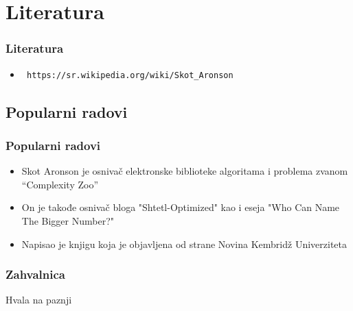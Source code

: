\documentclass{beamer}
\begin{document}
\section{Literatura}
\begin{frame}[fragile]\frametitle{Literatura}
	\begin{itemize}
	\item \begin{verbatim} https://sr.wikipedia.org/wiki/Skot_Aronson \end{verbatim}
	\end{itemize}
\end{frame}

\subsection{Popularni radovi}
\begin{frame}[fragile]\frametitle{Popularni radovi}
	\begin{itemize}	
		\item Skot Aronson je osnivač elektronske biblioteke algoritama i problema zvanom ``Complexity Zoo''
		\item On je takođe osnivač bloga "Shtetl-Optimized" kao i eseja "Who Can Name The Bigger Number?"
		\item Napisao je knjigu koja je objavljena od strane Novina Kembridž Univerziteta
	\end{itemize}
\end{frame}

\begin{frame}[fragile]\frametitle{Zahvalnica}
	\thispagestyle{empty}
	\begin{center}
		{\Huge Hvala na paznji}
	\end{center}	
\end{frame}


		


			
\end{document}
